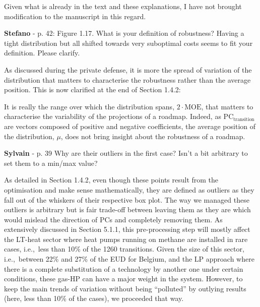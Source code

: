 \documentclass[12pt,a4paper]{article}
\def\ie{i.e.,\ }
\begin{document}
Given what is already in the text and these explanations, I have not brought modification to the manuscript in this regard.

\begin{mdframed}[style=comment] %
{\color{orange} \textbf{Stefano}} - p. 42: Figure 1.17. What is your definition of robustness? Having a tight distribution but all shifted towards very suboptimal costs seems to fit your definition. Please clarify.
\end{mdframed}

\noindent As discussed during the private defense, it is more the spread of variation of the distribution that matters to characterise the robustness rather than the average position. This is now clarified {\color{blue}at the end of Section 1.4.2}:

\begin{mdframed}[style=manuscript] %
It is really the range over which the distribution spans, $2\cdot \mathrm{MOE}$, that matters to characterise the variability of the projections of a roadmap. Indeed, as $\text{PC}_{\text{transition}}$ are vectors composed of positive and negative coefficients, the average position of the distribution, $\mu$, does not bring insight about the robustness of a roadmap.
\end{mdframed}

\begin{mdframed}[style=comment] %
{\color{purple} \textbf{Sylvain}} - p. 39 Why are their outliers in the first case? Isn't a bit arbitrary to set them to a min/max value?
\end{mdframed}

\noindent As detailed in Section 1.4.2, even though these points result from the optimisation and make sense mathematically, they are defined as outliers as they fall out of the whiskers of their respective box plot. The way we managed these outliers is arbitrary but is fair trade-off between leaving them as they are which would mislead the direction of PCs and completely removing them. As extensively discussed in Section 5.1.1, this pre-processing step will mostly affect the LT-heat sector where heat pumps running on methane are installed in rare cases, \ie less than 10\% of the 1260 transitions. Given the size of this sector, \ie between 22\% and 27\% of the EUD for Belgium, and the LP approach where there is a complete substitution of a technology by another one under certain conditions, these gas-HP can have a major weight in the system. However, to keep the main trends of variation without being ``polluted'' by outlying results (here, less than 10\% of the cases), we proceeded that way.
\end{document}
